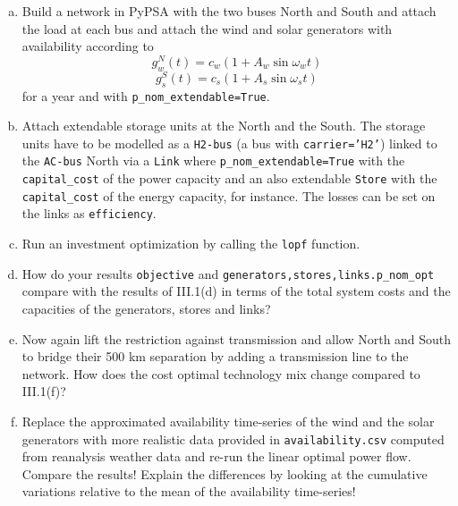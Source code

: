 \documentclass[11pt,a4paper,fleqn]{scrartcl}
\begin{document}
\begin{enumerate}[(a)]
 \item Build a network in PyPSA with the two buses North and South and attach the load at each bus and attach the wind and solar generators with availability according to $$g^{N}_{w}(t) = c_w(1+A_w\sin \omega_w t)$$ $$g^{S}_{s}(t) = c_s(1+A_s\sin \omega_s t)$$ for a year and with \texttt{p\_nom\_extendable=True}. 
 \item Attach extendable storage units at the North and the South. The storage units have to be modelled as a \texttt{H2-bus} (a bus with \texttt{carrier='H2'}) linked to the \texttt{AC-bus} North via a \texttt{Link} where \texttt{p\_nom\_extendable=True} with the \texttt{capital\_cost} of the power capacity and an also extendable \texttt{Store} with the \texttt{capital\_cost} of the energy capacity, for instance. The losses can be set on the links as \texttt{efficiency}.
 \item Run an investment optimization by calling the \texttt{lopf} function.
 \item How do your results \texttt{objective} and \texttt{{generators,stores,links}.p\_nom\_opt} compare with the results of III.1(d) in terms of the total system costs and the capacities of the generators, stores and links?
 \item Now again lift the restriction against transmission and allow North and South to bridge their 500 km separation by adding a transmission line to the network. How does the cost optimal technology mix change compared to III.1(f)?
 \item Replace the approximated availability time-series of the wind and the solar generators with more realistic data provided in \texttt{availability.csv} computed from reanalysis weather data and re-run the linear optimal power flow. Compare the results! Explain the differences by looking at the cumulative variations relative to the mean of the availability time-series!
\end{enumerate}
\end{document}
